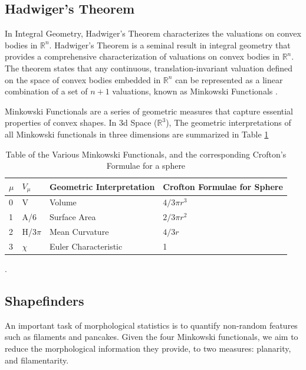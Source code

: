 \documentclass{article}
\begin{document}
\subsection{Hadwiger's Theorem}
In Integral Geometry, Hadwiger's Theorem characterizes the valuations on convex bodies in $\mathbb{R}^n$. Hadwiger's Theorem is a seminal result in integral geometry that provides a comprehensive characterization of valuations on convex bodies in $\mathbb{R}^n$. The theorem states that any continuous, translation-invariant valuation defined on the space of convex bodies embedded in $\mathbb{R}^n$ can be represented as a linear combination of a set of $n+1$ valuations, known as Minkowski Functionals \cite{adler_taylor_2007}.

Minkowski Functionals are a series of geometric measures that capture essential properties of convex shapes. In 3d Space ($\mathbb{R}^3$), The geometric interpretations of all Minkowski functionals in three dimensions are summarized in Table \ref{table:table_of_formulae} 

\begin{table}[]
\centering
\begin{tabular}{|l|l|l|l|}
\hline
\textbf{$\mu$} & \textbf{$V_\mu$} & \textbf{Geometric Interpretation} & \textbf{Crofton Formulae for Sphere} \\ \hline
0              & V                & Volume                            & $4/3 \pi r^3$                \\ \hline
1              & A/6              & Surface Area                      & $2/3 \pi r^2$                  \\ \hline
2              & H/$3\pi$         & Mean Curvature                    & $4/3r$                        \\ \hline
3              & $\chi$           & Euler Characteristic              & 1                                    \\ \hline
\end{tabular}
\caption{Table of the Various Minkowski Functionals, and the corresponding Crofton's Formulae for a sphere \cite{AmitSetaThesis}}.
\label{table:table_of_formulae}
\end{table}


\subsection{Shapefinders}
An important task of morphological statistics is to quantify non-random features such as filaments and pancakes. Given the four Minkowski functionals, we aim to reduce the morphological information they provide, to two measures: planarity, and filamentarity. \cite{Schmalzing1999}
\end{document}
